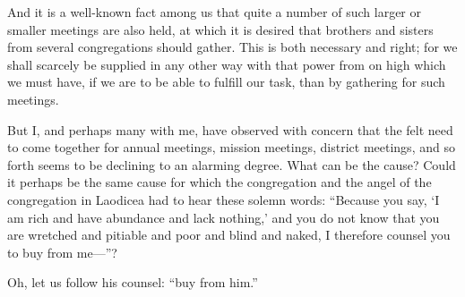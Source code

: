 And it is a well-known fact among us that quite a number of such larger or smaller meetings are also held, at which it is desired that brothers and sisters from several congregations should gather. This is both necessary and right; for we shall scarcely be supplied in any other way with that power from on high which we must have, if we are to be able to fulfill our task, than by gathering for such meetings.

But I, and perhaps many with me, have observed with concern that the felt need to come together for annual meetings, mission meetings, district meetings, and so forth seems to be declining to an alarming degree. What can be the cause? Could it perhaps be the same cause for which the congregation and the angel of the congregation in Laodicea had to hear these solemn words: “Because you say, ‘I am rich and have abundance and lack nothing,’ and you do not know that you are wretched and pitiable and poor and blind and naked, I therefore counsel you to buy from me—”?

Oh, let us follow his counsel: “buy from him.”
